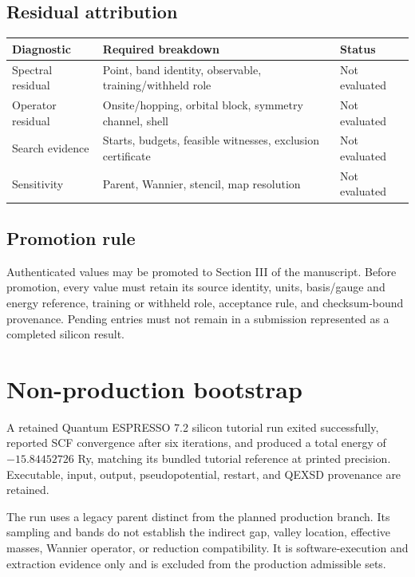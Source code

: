 \documentclass[11pt]{article}
\newenvironment{prospective}{\color{prospectivered}}{}
\begin{document}
\begin{prospective}
\subsection{Residual attribution}
\begin{center}\small
\begin{tabularx}{\textwidth}{XXX}
\toprule
\textbf{Diagnostic} & \textbf{Required breakdown} & \textbf{Status} \\
\midrule
Spectral residual & Point, band identity, observable, training/withheld role & Not evaluated \\
Operator residual & Onsite/hopping, orbital block, symmetry channel, shell & Not evaluated \\
Search evidence & Starts, budgets, feasible witnesses, exclusion certificate & Not evaluated \\
Sensitivity & Parent, Wannier, stencil, map resolution & Not evaluated \\
\bottomrule
\end{tabularx}
\end{center}
\subsection{Promotion rule}
Authenticated values may be promoted to Section III of the manuscript. Before promotion, every value must retain its source identity, units, basis/gauge and energy reference, training or withheld role, acceptance rule, and checksum-bound provenance. Pending entries must not remain in a submission represented as a completed silicon result.

\end{prospective}
\clearpage
\section{Non-production bootstrap}\label{app:bootstrap}
A retained Quantum ESPRESSO 7.2 silicon tutorial run exited successfully, reported SCF convergence after six iterations, and produced a total energy of $-15.84452726$ Ry, matching its bundled tutorial reference at printed precision. Executable, input, output, pseudopotential, restart, and QEXSD provenance are retained.

The run uses a legacy parent distinct from the planned production branch. Its sampling and bands do not establish the indirect gap, valley location, effective masses, Wannier operator, or reduction compatibility. It is software-execution and extraction evidence only and is excluded from the production admissible sets.
\end{document}
